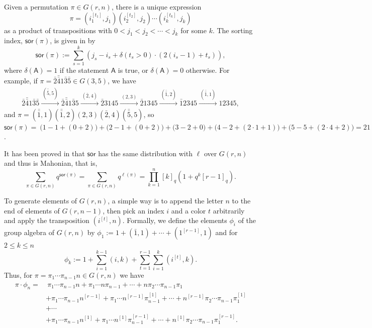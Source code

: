 \documentclass[a4paper, reqno, 11pt]{amsart}
\newcommand{\sor}{{\textsf{sor}}}
\numberwithin{equation}{section}
\begin{document}
Given a permutation $\pi\in G(r,n)$, there is a unique expression $$\pi=(i_1^{[t_1]},j_1)(i_2^{[t_2]},j_2)\cdots(i_k^{[t_k]},j_k)$$ as a product of transpositions with $0<j_1<j_2<\cdots<j_k$ for some $k$.
The sorting index, $\sor(\pi)$, is given in \cite{ELW_15} by
\begin{equation}\label{eq:def_sor}
\sor(\pi) := \sum_{s=1}^k \left( j_s-i_s + \delta(t_s>0)\cdot\left( 2(i_s-1)+t_s \right) \right),
\end{equation}
where $\delta(\mathsf{A})=1$ if the statement $\mathsf{A}$ is true, or $\delta(\mathsf{A})=0$ otherwise.
For example, if $\pi=\bar{2}\bar{\bar{4}}1\bar{3}\bar{5}\in G(3,5)$, we have
\begin{align*}
\bar{2}\bar{\bar{4}}1\bar{3}\bar{5} \stackrel{~(\bar{\bar{5}},5)~}{\longrightarrow} 
\bar{2}\bar{\bar{4}}1\bar{3}5 \stackrel{~(\bar{2},4)~}{\longrightarrow}
\bar{2}3145 \stackrel{~(2,3)~}{\longrightarrow}
\bar{2}1345 \stackrel{~(\bar{\bar{1}},2)~}{\longrightarrow}
\bar{1}2345 \stackrel{~(\bar{\bar{1}},1)~}{\longrightarrow}
12345,
\end{align*}
and $\pi=(\bar{\bar{1}},1)(\bar{\bar{1}},2)(2,3)(\bar{2},4)(\bar{\bar{5}},5)$, so $\sor(\pi) = \ \big(1-1+(0+2)\big) + \big(2-1+(0+2)\big) + \big(3-2+0\big) + \big(4-2+(2\cdot 1+1)\big) + \big(5-5+(2\cdot 4+2)\big) = 21$.




It has been proved in \cite{ELW_15} that $\sor$ has the same distribution with $\ell$ over $G(r,n)$ and thus is Mahonian, that is,
\begin{equation}\label{eq:equidist_sor}
\sum_{\pi\in G(r,n)}q^{\sor(\pi)}=\sum_{\pi\in G(r,n)}q^{\ell(\pi)}= \prod_{k=1}^n[k]_q(1+q^k[r-1]_q).
\end{equation}

To generate elements of $G(r,n)$, a simple way is to append the letter $n$ to the end of elements of $G(r,n-1)$, then pick an index $i$ and a color $t$ arbitrarily and apply the transposition $(i^{[t]},n)$.
Formally, we define the elements $\phi_i$ of the group algebra of $G(r,n)$ by $\phi_1:=1+(\bar{1},1)+\cdots+(1^{[r-1]},1)$ and for $2\leq k\leq n$ $$\phi_k:=1+\sum_{i=1}^{k-1}(i,k)+\sum_{t=1}^{r-1}\sum_{i=1}^{k}(i^{[t]},k).$$
Thus, for $\pi=\pi_1\cdots\pi_{n-1}n\in G(r,n)$ we have
\begin{align*}
\pi\cdot\phi_n = & \ \pi_1\cdots\pi_{n-1}n + \pi_1\cdots n\pi_{n-1} + \cdots + n\pi_2\cdots\pi_{n-1}\pi_1 \\
& + \pi_1\cdots\pi_{n-1}n^{[r-1]} + \pi_1\cdots n^{[r-1]}\pi_{n-1}^{[1]} + \cdots + n^{[r-1]}\pi_2\cdots\pi_{n-1}\pi_1^{[1]} \\
& + \cdots \\
& + \pi_1\cdots\pi_{n-1}n^{[1]} + \pi_1\cdots n^{[1]}\pi_{n-1}^{[r-1]} + \cdots + n^{[1]}\pi_2\cdots\pi_{n-1}\pi_1^{[r-1]}.
\end{align*}
\end{document}
